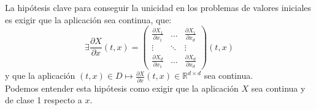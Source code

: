\noindent
La hipótesis clave para conseguir la unicidad en los problemas de valores iniciales es exigir que la aplicación
sea continua, que:
\begin{equation*}
    \exists \frac{\partial X}{\partial x}(t,x) = \left(\begin{array}{ccc}
        \frac{\partial X_1}{\partial x_1} & \ldots & \frac{\partial X_1}{\partial x_d} \\
        \vdots & \ddots & \vdots \\
        \frac{\partial X_d}{\partial x_{1}} & \ldots & \frac{\partial X_d}{\partial x_d}
    \end{array}\right)(t,x)
\end{equation*}
y que la aplicación $(t,x)\in D\longmapsto \frac{\partial X}{\partial x}(t,x)\in \mathbb{R}^{d\times d}$ sea continua.\\

\noindent
Podemos entender esta hipótesis como exigir que la aplicación $X$ sea continua y de clase 1 respecto a $x$.

